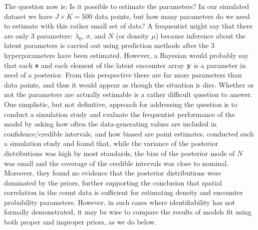 The question now is: Is it possible to estimate the parameters? In our
simulated dataset we have $J \times K = 500$ data points, but how many
parameters do we need to estimate with this rather small set of data?
A frequentist might say that there are only 3 parameters: $\lambda_0$,
$\sigma$, and $N$ (or density $\mu$) because inference about the
latent parameters is carried out using prediction methods after the 3
hyperparameters have been estimated. However, a Bayesian would
probably say that each $\bf s$ and each element of the latent
encounter array $\bf y$ is a parameter in need of a posterior. From
this perspective there are far more parameters than data points, and
thus it would appear as though the situation is dire. Whether or not
the parameters are actually estimable is a rather difficult question
to answer. One simplistic, but not definitive, approach for addressing
the question is to conduct a simulation study and evaluate the
frequentist performance of the model by asking how often the
data-generating values are included in confidence/credible intervals,
and how biased are point estimates. \citet{chandler_royle:2012}
conducted such a simulation study and found that, while the variance
of the posterior distributions was high by most standards, the bias of
the posterior mode of $N$ was small and the coverage of the credible
intervals was close to nominal. Moreover, they found no evidence that the
posterior distributions were dominated by the priors, further
supporting the conclusion that spatial correlation in the count data
is sufficient for estimating density and encounter probability
parameters. %
However, in such cases where identifiability has not formally
demonstrated, it may be wise to compare the results of models fit
using both proper and improper priors, as we do below.

